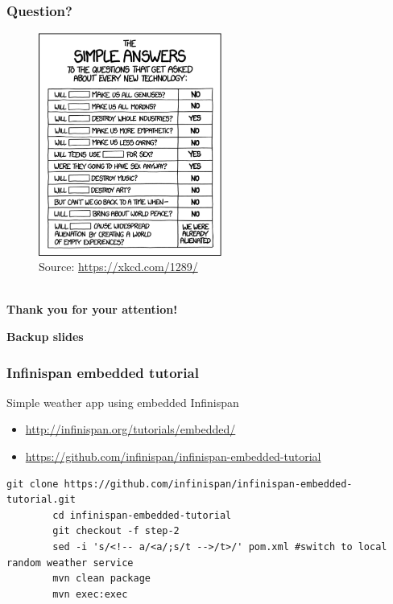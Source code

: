 \documentclass[10pt,utf8]{beamer}
\begin{document}
\begin{frame}
	\frametitle{Question?}
	\begin{figure}
		\centering
		\includegraphics[width=6cm]{./img/simple_answers.eps}
		\caption{\tiny{Source: \url{https://xkcd.com/1289/}}}
	\end{figure}
\end{frame}

\begin{frame}
	\centering
	\huge{} \\
	\vspace{1cm}
	\huge{\textbf{Thank you for your attention!}} \\
	\vspace{1cm}
\end{frame}


\begin{frame}
	\centering
	\huge{\textbf{Backup slides}}
\end{frame}

\begin{frame}[fragile]
	\frametitle{Infinispan embedded tutorial}
	Simple weather app using embedded Infinispan
	\begin{itemize}
		\item \small{\url{http://infinispan.org/tutorials/embedded/}}
		\item \small{\url{https://github.com/infinispan/infinispan-embedded-tutorial}}
	\end{itemize}
	\vspace{0.3cm}
	\begin{lstlisting}[style=Bash]
		git clone https://github.com/infinispan/infinispan-embedded-tutorial.git
		cd infinispan-embedded-tutorial
		git checkout -f step-2
		sed -i 's/<!-- a/<a/;s/t -->/t>/' pom.xml #switch to local random weather service
		mvn clean package
		mvn exec:exec
	\end{lstlisting}
\end{frame}
\end{document}
